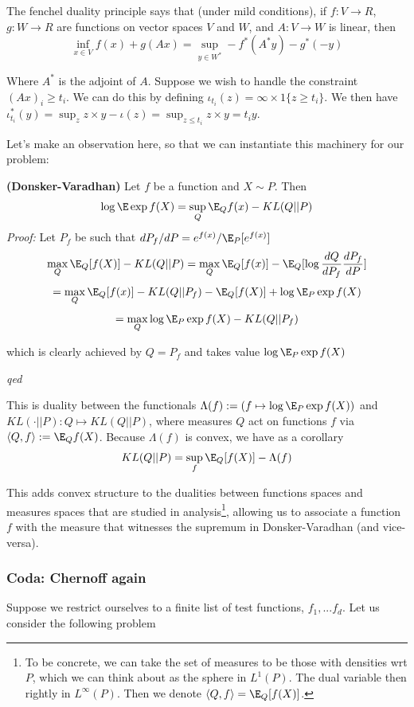 \documentclass[
  letterpaper,
  DIV=11,
  numbers=noendperiod]{scrartcl}
\begin{document}
The fenchel duality principle says that (under mild conditions), if
\(f: V \rightarrow R\), \(g: W \rightarrow R\) are functions on vector
spaces \(V\) and \(W\), and \(A: V \rightarrow W\) is linear, then
\[\inf_{x \in V} f(x) + g(Ax) = \sup_{y \in W^*} -f^*(A^*y) - g^*(-y)\]

Where \(A^*\) is the adjoint of \(A\). Suppose we wish to handle the
constraint \((Ax)_i \geq t_i\). We can do this by defining
\(\iota_{t_i}(z) = \infty \times 1\{z \geq t_i\}\). We then have
\(\iota^*_{t_i}(y) = \sup_z z\times y - \iota(z) = \sup_{z \leq t_i} z \times y = t_i y\).

Let's make an observation here, so that we can instantiate this
machinery for our problem:

\textbf{(Donsker-Varadhan)} Let \(f\) be a function and \(X \sim P\).
Then \[\log \E \exp f(X) = \sup_Q \E_Q f(x) - KL(Q || P)\] \emph{Proof:}
Let \(P_f\) be such that \(dP_f/dP = e^{f(x)}/\E_P[e^{f(x)}]\)
\[\max_Q \E_Q[f(X)] - KL(Q || P) = \max_Q \E_Q[f(x)] - \E_Q[\log \frac{dQ}{dP_f}\frac{dP_f}{dP}]\]
\[= \max_Q \E_Q[f(x)] - KL(Q || P_f) - \E_Q[f(X)] + \log \E_P \exp f(X)\]
\[ = \max_Q \log \E_P \exp f(X) - KL(Q || P_f)\]

which is clearly achieved by \(Q = P_f\) and takes value
\(\log \E_P \exp f(X)\)

\emph{qed}

This is duality between the functionals
\(\Lambda(f) := (f \mapsto \log \E_P \exp f(X))\) and
\(KL(\cdot || P): Q \mapsto KL(Q || P)\), where measures \(Q\) act on
functions \(f\) via \(\langle Q, f\rangle := \E_Q f(X)\). Because
\(\Lambda(f)\) is convex, we have as a corollary
\[KL(Q || P) = \sup_f \E_Q[f(X)] - \Lambda(f)\]

This adds convex structure to the dualities between functions spaces and
measures spaces that are studied in analysis\footnote{To be concrete, we
  can take the set of measures to be those with densities wrt \(P\),
  which we can think about as the sphere in \(L^1(P)\). The dual
  variable then rightly in \(L^\infty(P)\). Then we denote
  \(\langle Q, f\rangle = \E_Q[f(X)]\).}, allowing us to associate a
function \(f\) with the measure that witnesses the supremum in
Donsker-Varadhan (and vice-versa).

\subsubsection{Coda: Chernoff again}\label{coda-chernoff-again}

Suppose we restrict ourselves to a finite list of test functions,
\(f_1, ... f_d\). Let us consider the following problem
\end{document}
